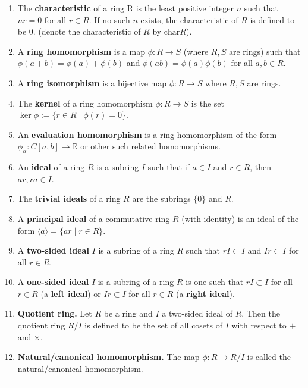 \begin{enumerate}
        \item The \textbf{characteristic} of a ring R is the least positive integer $n$ such that $nr=0$ for all $r \in R$. If no such $n$ exists, the characteristic of $R$ is defined to be 0. (denote the characteristic of $R$ by $\textrm{char} R$). 
	\item A \textbf{ring homomorphism} is a map $\phi: R \to S$ (where $R,S$ are rings) such that $\phi(a+b) = \phi(a) + \phi(b)$ and $\phi(ab) = \phi(a)\phi(b)$ for all $a,b \in R$. 
        \item A \textbf{ring isomorphism} is a bijective map $\phi: R \to S$ where $R,S$ are rings. 
        \item The \textbf{kernel} of a ring homomorphism $\phi: R \to S$ is the set $\ker\phi := \{r \in R \mid \phi(r) = 0\}$. 
        \item An \textbf{evaluation homomorphism} is a ring homomorphism of the form $\phi_\alpha: C[a,b] \to \mathbb{R}$ or other such related homomorphisms. 
        \item An \textbf{ideal} of a ring $R$ is a subring $I$ such that if $a \in I$ and $r \in R$, then $ar,ra \in I$. 
        \item The \textbf{trivial ideals} of a ring $R$ are the subrings $\{0\}$ and $R$. 
        \item A \textbf{principal ideal} of a commutative ring $R$ (with identity) is an ideal of the form $\langle a \rangle = \{ar \mid r \in R\}$. 
        \item A \textbf{two-sided ideal} $I$ is a subring of a ring $R$ such that $rI \subset I$ and $Ir \subset I$ for all $r \in R$. 
        \item A \textbf{one-sided ideal} $I$ is a subring of a ring $R$ is one such that $rI \subset I$ for all $r \in R$ (a \textbf{left ideal}) or $Ir \subset I$ for all $r \in R$ (a \textbf{right ideal}). 
	\item \textbf{Quotient ring. } Let $R$ be a ring and $I$ a two-sided ideal of $R$. Then the quotient ring $R/I$ is defined to be the set of all cosets of $I$ with respect to $+$ and $\times$. 
	\item \textbf{Natural/canonical homomorphism. } The map $\phi: R \to R/I$ is called the natural/canonical homomorphism. 
	\begin{center}
		\hrule
	\end{center}
\end{enumerate}



